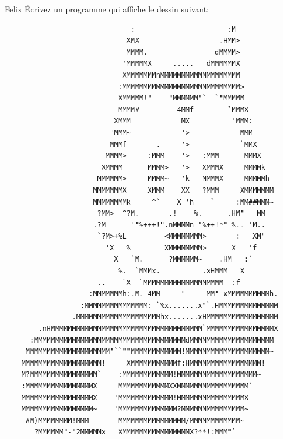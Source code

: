 \documentclass[a4paper,11pt]{article}
\begin{document}
	\newpage
	\begin{Exercice}{Felix}
		\'Ecrivez un programme qui affiche le dessin suivant:

	\begin{verbatim}
	                          :                      :M
	                         XMX                   .HMM>
	                         MMMM.                dMMMM>
	                        'MMMMMX     .....   dMMMMMMX
	                        XMMMMMMMnMMMMMMMMMMMMMMMMMMM
	                       :MMMMMMMMMMMMMMMMMMMMMMMMMMMM>
	                       XMMMMM!"    "MMMMMM"`  `"MMMMM
	                       MMMM#         4MMf        `MMMX
	                      XMMM            MX          'MMM:
	                     'MMM~            '>            MMM
	                     MMMf       .     '>            `MMX
	                    MMMM>     :MMM    '>   :MMM      MMMX
	                   XMMMM      MMMM>   '>   XMMMX     MMMMk
	                  MMMMMM>     MMMM~   'k   MMMMX     MMMMMh
	                 MMMMMMMX     XMMM    XX   ?MMM     XMMMMMMM
	                 MMMMMMMMk     ^`    X 'h    `     :MM##MMM~
	                  ?MM>  ^?M.       .!    %.      .HM"   MM
	                 .?M      '"%+++!".nMMMMn "%++!*" %.. 'M..
	                  `?M>+%L         <MMMMMMMM>       :   XM"
	                    'X   %        XMMMMMMMM>      X   'f
	                      X   `M.      ?MMMMMM~    .HM   :`
	                       %.  `MMMx.          .xHMMM   X
	                  ..    `X  `MMMMMMMMMMMMMMMMMMM  :f
	                :MMMMMMMh:.M. 4MM     "     MM" xMMMMMMMMMMh.
	              :MMMMMMMMMMMMMMM: `%x.......x"`.HMMMMMMMMMMMMMM
	            .MMMMMMMMMMMMMMMMMMMMhx.......xHMMMMMMMMMMMMMMMMM
	    .nHMMMMMMMMMMMMMMMMMMMMMMMMMMMMMMMMMMMM`MMMMMMMMMMMMMMMMX
	  :MMMMMMMMMMMMMMMMMMMMMMMMMMMMMMMMMMMMdMMMMMMMMMMMMMMMMMMMM
	 MMMMMMMMMMMMMMMMMMMM"``""MMMMMMMMMMMM!MMMMMMMMMMMMMMMMMMMM~
	MMMMMMMMMMMMMMMMMMM!     XMMMMMMMMMMMf:HMMMMMMMMMMMMMMMMM!
	M?MMMMMMMMMMMMMMMM`    :MMMMMMMMMMMM!MMMMMMMMMMMMMMMMMMM~
	:MMMMMMMMMMMMMMMMX     MMMMMMMMMMMMXXMMMMMMMMMMMMMMMMM`
	MMMMMMMMMMMMMMMMMX    'MMMMMMMMMMMMM!MMMMMMMMMMMMMMMMX
	MMMMMMMMMMMMMMMMM~    'MMMMMMMMMMMMMM?MMMMMMMMMMMMMMM~
	 #M)MMMMMMMM!MMM       MMMMMMMMMMMMMMMM/MMMMMMMMMMMM~
	   ?MMMMMM"-"2MMMMMx   XMMMMMMMMMMMMMMMMX?**!:MMM"`
	\end{verbatim}
\end{Exercice}
\end{document}

